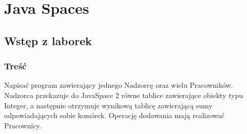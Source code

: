 \newpage


\section{Java Spaces}
	\subsection{Wstęp z laborek}
		\subsubsection{Treść}
			Napisać program zawierający jednego Nadzorcę oraz wielu Pracowników. Nadzorca przekazuje do JavaSpace 2 równe tablice zawierające obiekty typu Integer, a następnie otrzymuje wynikową tablicę zawierającą sumy odpowiadających sobie komórek. Operację dodawania mają realizować Pracownicy.
